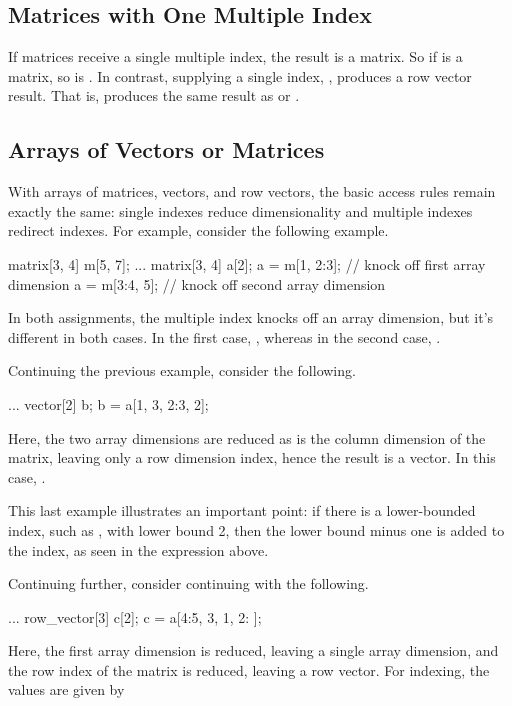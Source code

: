\subsection{Matrices with One Multiple Index}

If matrices receive a single multiple index, the result is a matrix.
So if  is a matrix, so is .  In contrast,
supplying a single index, , produces a row vector result.
That is,  produces the same result as  
or . 

\subsection{Arrays of Vectors or Matrices}

With arrays of matrices, vectors, and row vectors, the basic access
rules remain exactly the same: single indexes reduce dimensionality
and multiple indexes redirect indexes.  For example, consider the
following example.
%
\begin{stancode}
matrix[3, 4] m[5, 7];
...
matrix[3, 4] a[2];
a = m[1, 2:3];  // knock off first array dimension
a = m[3:4, 5];  // knock off second array dimension
\end{stancode}
%
In both assignments, the multiple index knocks off an array dimension,
but it's different in both cases.  In the first case, , whereas in the second case, .

Continuing the previous example, consider the following.
%
\begin{stancode}
...
vector[2] b;
b = a[1, 3, 2:3, 2];
\end{stancode}
%
Here, the two array dimensions are reduced as is the column dimension
of the matrix, leaving only a row dimension index, hence the result is
a vector.  In this case, .

This last example illustrates an important point: if there is a
lower-bounded index, such as , with lower bound 2, then the
lower bound minus one is added to the index, as seen in the  expression above.

Continuing further, consider continuing with the following.
%
\begin{stancode}
...
row_vector[3] c[2];
c = a[4:5, 3, 1, 2: ];
\end{stancode}
%
Here, the first array dimension is reduced, leaving a single array
dimension, and the row index of the matrix is reduced, leaving a row
vector.  For indexing, the values are given by


